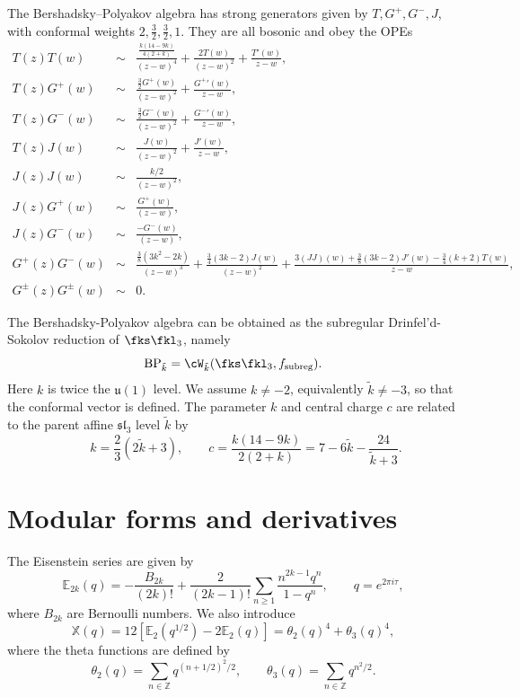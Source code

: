 \documentclass[a4paper,11pt]{article}
\theoremstyle{definition}
\theoremstyle{definition}
\theoremstyle{remark}
\newcommand{\be}{\begin{equation}}
\newcommand{\ee}{\end{equation}}
\newcommand{\beqn}{\begin{eqnarray}}
\newcommand{\eeqn}{\end{eqnarray}}
\begin{document}
The Bershadsky--Polyakov algebra    has  strong generators   given by $T, G^+,G^-,J$, with conformal weights $2,\frac32,\frac32,1$. They are all bosonic and obey  the OPEs  \cite{Beem:2017ooy}
  \beqn
T(z)T(w) &\sim& \frac{\frac{k(14-9k)}{4(2+k)}}{(z-w)^4} + \frac{2T(w)}{(z-w)^2} + \frac{T'(w)}{z-w} ,
\nonumber\\
T(z)G^+(w) &\sim& \frac{\frac{3}{2}G^+(w)}{(z-w)^2} + \frac{{G^+}'(w)}{z-w} ,
\nonumber\\
T(z)G^-(w) &\sim& \frac{\frac{3}{2}G^-(w)}{(z-w)^2} + \frac{{G^-}'(w)}{z-w} ,
\nonumber\\
T(z)J(w) &\sim& \frac{ J(w)}{(z-w)^2} + \frac{{J}'(w)}{z-w} ,
\nonumber\\
J(z)J(w) &\sim& \frac{k/2}{(z-w)^2} ,
\nonumber\\
J(z)G^+(w) &\sim& \frac{G^+(w)}{(z-w)} ,
\nonumber\\
J(z)G^-(w) &\sim& \frac{-G^-(w)}{(z-w)} ,
\nonumber\\
G^+(z)G^-(w) &\sim& \frac{\frac{3}{8}(3k^2-2k)}{(z-w)^3} + \frac{\frac{3}{4}(3k-2)J(w)}{(z-w)^2}
+ \frac{3(JJ)(w) + \frac{3}{8}(3k-2)J'(w) - \frac{3}{4}(k+2)T(w)}{z-w} ,
\nonumber\\
G^\pm(z)G^\pm(w) &\sim& 0.\nonumber
\eeqn
 

 

The Bershadsky-Polyakov algebra can be obtained as the    subregular Drinfel\textquoteright{}d-Sokolov reduction of $\fks\fkl_3$, namely
\be
 \text{BP}_{ \tilde  k}=\cW_{\tilde k}(\fks\fkl_3,f_\text{subreg}). 
\ee
 Here $k$ is twice the $\mathfrak u(1)$ level. We assume $k\ne-2$, equivalently $\tilde k\ne-3$, so that the conformal vector is defined. The parameter $k$ and central charge $c$ are related to the parent affine $\mathfrak{sl}_3$ level $\tilde k$ by  
\be
 \qquad k = \frac{2}{3}(2\tilde{k}+3), \qquad
 c =\frac{k(14-9k)}{2(2+k)}=7-6 \tilde k-\frac{24}{\tilde k+3}. 
\ee


 

 \section{Modular forms and derivatives}\label{MLDEconvention}
 
The Eisenstein series are given by 
  \be\label{Dwmld}
\mathbb{E}_{2k}(q)
=-\frac{B_{2k}}{(2k)!}
+\frac{2}{(2k-1)!}\sum_{n\ge1}\frac{n^{2k-1}q^n}{1-q^n},
\qquad q=e^{2\pi i\tau},
\ee
where $B_{2k}$ are Bernoulli numbers. 
We also introduce
\be
\mathbb{X}(q) 
=12\left[\mathbb{E}_2(q^{1/2})-2\mathbb{E}_2(q)\right]=\theta_2(q)^4+\theta_3(q)^4,
\ee
where   the theta functions are defined by
\be
\theta_2(q)=\sum_{n\in\mathbb Z}q^{(n+1/2)^2/2},\qquad
\theta_3(q)=\sum_{n\in\mathbb Z}q^{n^2/2}.
\ee 
\end{document}
